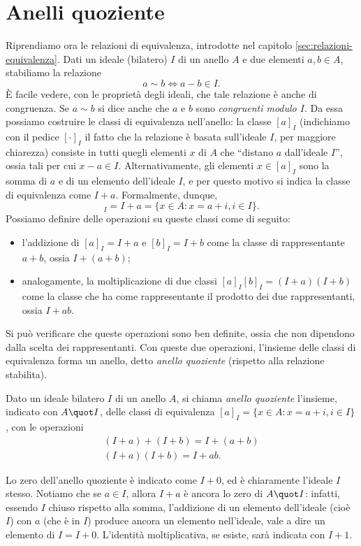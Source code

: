 \section{Anelli quoziente} \label{sec:anelli-quoziente}
Riprendiamo ora le relazioni di equivalenza, introdotte nel capitolo \ref{sec:relazioni-equivalenza}.
Dati un ideale (bilatero) $I$ di un anello $A$ e due elementi $a,b\in A$, stabiliamo la relazione
\begin{equation*}
	a\sim b\iff a-b\in I.
\end{equation*}
È facile vedere, con le proprietà degli ideali, che tale relazione è anche di congruenza.
Se $a\sim b$ si dice anche che $a$ e $b$ sono \emph{congruenti modulo $I$}.
Da essa possiamo costruire le classi di equivalenza nell'anello: la classe $[a]_I$ (indichiamo con il pedice $[\cdot]_I$ il fatto che la relazione è basata sull'ideale $I$, per maggiore chiarezza) consiste in tutti quegli elementi $x$ di $A$ che ``distano $a$ dall'ideale $I$'', ossia tali per cui $x-a\in I$.
Alternativamente, gli elementi $x\in[a]_I$ sono la somma di $a$ e di un elemento dell'ideale $I$, e per questo motivo si indica la classe di equivalenza come $I+a$.
Formalmente, dunque,
\begin{equation*}
	[a]_I=I+a=\{x\in A\colon x=a+i, i\in I\}.
\end{equation*}
Possiamo definire delle operazioni su queste classi come di seguito:
\begin{itemize}
	\item l'addizione di $[a]_I=I+a$ e $[b]_I=I+b$ come la classe di rappresentante $a+b$, ossia $I+(a+b)$;
	\item analogamente, la moltiplicazione di due classi $[a]_I[b]_I=(I+a)(I+b)$ come la classe che ha come rappresentante il prodotto dei due rappresentanti, ossia $I+ab$.
\end{itemize}
Si può verificare che queste operazioni sono ben definite, ossia che non dipendono dalla scelta dei rappresentanti.
Con queste due operazioni, l'insieme delle classi di equivalenza forma un anello, detto \emph{anello quoziente} (rispetto alla relazione stabilita).

\begin{definizione} \label{d:anello-quoziente}
	Dato un ideale bilatero $I$ di un anello $A$, si chiama \emph{anello quoziente} l'insieme, indicato con $A\quot I$, delle classi di equivalenza $[a]_I=\{x\in A\colon x=a+i, i\in I\}$, con le operazioni
	\begin{equation}
		\begin{gathered}
			(I+a)+(I+b)=I+(a+b)\\ (I+a)(I+b)=I+ab.
		\end{gathered}
		\label{eq:operazioni-anello-quoziente}
	\end{equation}
\end{definizione}
Lo zero dell'anello quoziente è indicato come $I+0$, ed è chiaramente l'ideale $I$ stesso.
Notiamo che se $a\in I$, allora $I+a$ è ancora lo zero di $A\quot I$: infatti, essendo $I$ chiuso rispetto alla somma, l'addizione di un elemento dell'ideale (cioè $I$) con $a$ (che è in $I$) produce ancora un elemento nell'ideale, vale a dire un elemento di $I=I+0$.
L'identità moltiplicativa, se esiste, sarà indicata con $I+1$.

